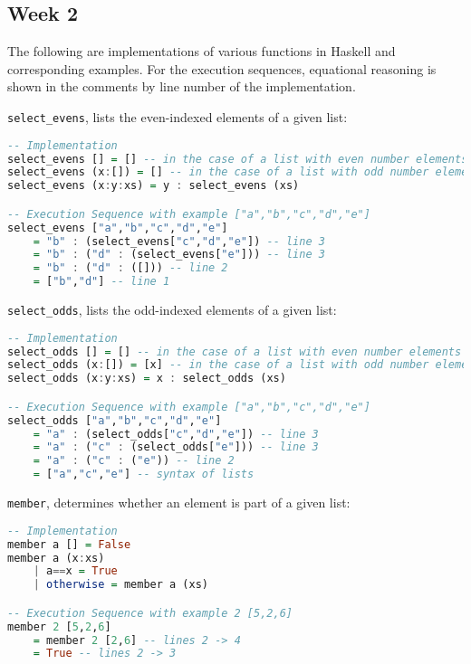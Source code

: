 \documentclass{article}
\theoremstyle{theorem}
\theoremstyle{definition}
\theoremstyle{remark}
\begin{document}
\subsection{Week 2}

The following are implementations of various functions in Haskell and corresponding examples. For the execution sequences, equational reasoning is shown in the comments by line number of the implementation.

\noindent \texttt{select\_evens}, lists the even-indexed elements of a given list:
\begin{lstlisting}[language=Haskell]
-- Implementation
select_evens [] = [] -- in the case of a list with even number elements
select_evens (x:[]) = [] -- in the case of a list with odd number elements
select_evens (x:y:xs) = y : select_evens (xs)

-- Execution Sequence with example ["a","b","c","d","e"]
select_evens ["a","b","c","d","e"]
    = "b" : (select_evens["c","d","e"]) -- line 3
    = "b" : ("d" : (select_evens["e"])) -- line 3
    = "b" : ("d" : ([])) -- line 2
    = ["b","d"] -- line 1
\end{lstlisting} 

\noindent \texttt{select\_odds}, lists the odd-indexed elements of a given list:
\begin{lstlisting}[language=Haskell]
-- Implementation
select_odds [] = [] -- in the case of a list with even number elements
select_odds (x:[]) = [x] -- in the case of a list with odd number elements
select_odds (x:y:xs) = x : select_odds (xs)

-- Execution Sequence with example ["a","b","c","d","e"]
select_odds ["a","b","c","d","e"]
    = "a" : (select_odds["c","d","e"]) -- line 3
    = "a" : ("c" : (select_odds["e"])) -- line 3
    = "a" : ("c" : ("e")) -- line 2
    = ["a","c","e"] -- syntax of lists
\end{lstlisting}

\noindent \texttt{member}, determines whether an element is part of a given list:
\begin{lstlisting}[language=Haskell]
-- Implementation
member a [] = False
member a (x:xs)
    | a==x = True
    | otherwise = member a (xs)

-- Execution Sequence with example 2 [5,2,6]
member 2 [5,2,6]
    = member 2 [2,6] -- lines 2 -> 4
    = True -- lines 2 -> 3
\end{lstlisting}

\newpage
\end{document}
